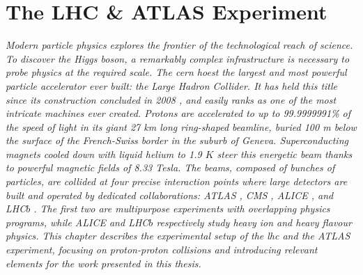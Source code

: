 \chapter{\color{oxfordblue} The LHC \& ATLAS Experiment}\label{chapter-ATLAS}
\ChapFrame

\textit{
Modern particle physics explores the frontier of the technological reach of science. To discover the Higgs boson, a remarkably complex infrastructure is necessary to probe physics at the required scale. The \gls{cern} hoest the largest and most powerful particle accelerator ever built: the Large Hadron Collider. It has held this title since its construction concluded in 2008 \cite{LyndonEvans_2008}, and easily ranks as one of the most intricate machines ever created. Protons are accelerated to up to 99.9999991\% of the speed of light in its giant 27 km long ring-shaped beamline, buried 100 m below the surface of the French-Swiss border in the suburb of Geneva. Superconducting magnets cooled down with liquid helium to 1.9 $K$ steer this energetic beam thanks to powerful magnetic fields of 8.33 Tesla. The beams, composed of bunches of particles, are collided at four precise interaction points where large detectors are built and operated by dedicated collaborations: ATLAS \cite{TheATLASCollaboration_2008}, CMS \cite{TheCMSCollaboration_2008}, ALICE \cite{TheALICECollaboration_2008}, and LHC$b$ \cite{TheLHCbCollaboration_2008}. The first two are multipurpose experiments with overlapping physics programs, while ALICE and LHC$b$ respectively study heavy ion and heavy flavour physics. This chapter describes the experimental setup of the \gls{lhc} and the ATLAS experiment, focusing on proton-proton collisions and introducing relevant elements for the work presented in this thesis.} 

